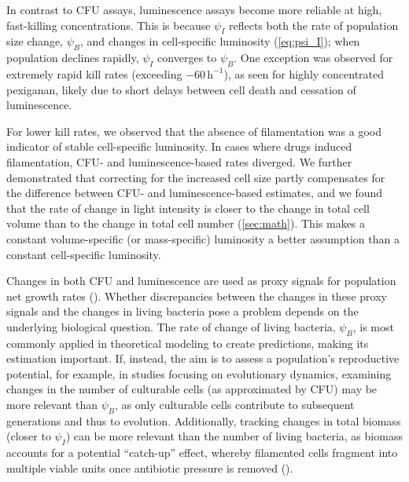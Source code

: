 In contrast to CFU assays, luminescence assays become more reliable at high, fast-killing concentrations.
This is because \(\psi_I\) reflects both the rate of population size change, \(\psi_B\), and changes in cell-specific luminosity (\autoref{eq:psi_I}); when population declines rapidly, \(\psi_I\) converges to \(\psi_B\).
One exception was observed for extremely rapid kill rates (exceeding $-60\,\mathrm{h}^{-1}$), as seen for highly concentrated pexiganan, likely due to short delays between cell death and cessation of luminescence.

For lower kill rates, we observed that the absence of filamentation was a good indicator of stable cell-specific luminosity.
In cases where drugs induced filamentation, CFU- and luminescence-based rates diverged.
We further demonstrated that correcting for the increased cell size partly compensates for the difference between CFU- and luminescence-based estimates, and we found that the rate of change in light intensity is closer to the change in total cell volume than to the change in total cell number (\autoref{sec:math}).
This makes a constant volume-specific (or mass-specific) luminosity a better assumption than a constant cell-specific luminosity.

Changes in both CFU and luminescence are used as proxy signals for population net growth rates (\cite{Regoes2004, Kishony2003, Yeh2006, Chait2007, Foerster2016, Kavcic2020, Angermayr2022}).
Whether discrepancies between the changes in these proxy signals and the changes in living bacteria pose a problem depends on the underlying biological question.
The rate of change of living bacteria, $\psi_B$, is most commonly applied in theoretical modeling to create predictions, making its estimation important.
If, instead, the aim is to assess a population’s reproductive potential, for example, in studies focusing on evolutionary dynamics, examining changes in the number of culturable cells (as approximated by CFU) may be more relevant than $\psi_B$, as only culturable cells contribute to subsequent generations and thus to evolution.
Additionally, tracking changes in total biomass (closer to $\psi_I$) can be more relevant than the number of living bacteria, as biomass accounts for a potential ``catch-up'' effect, whereby filamented cells fragment into multiple viable units once antibiotic pressure is removed (\cite{Baquero1986, Cayron2023}).

